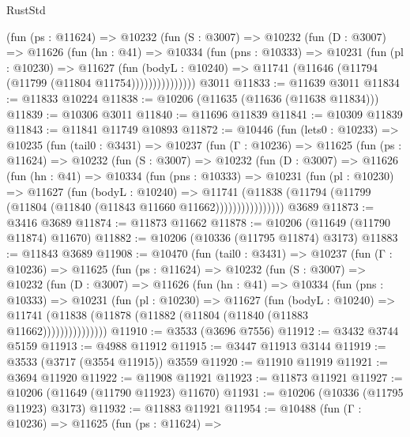 \begin{lexlean}{RustStd}
\begin{coremodule}
            (fun (ps : @11624) =>
            @10232
              (fun (S : @3007) =>
              @10232
                (fun (D : @3007) =>
                @11626
                  (fun (hn : @41) =>
                  @10334
                    (fun (pns : @10333) =>
                    @10231
                      (fun (pl : @10230) =>
                      @11627
                        (fun (bodyL : @10240) =>
                        @11741 (@11646 (@11794 (@11799 (@11804 @11754)))))))))))))))
    @3011
@11833 := @11639 @3011
@11834 := @11833 @10224
@11838 := @10206 (@11635 (@11636 (@11638 @11834)))
@11839 := @10306 @3011
@11840 := @11696 @11839
@11841 := @10309 @11839
@11843 := @11841 @11749 @10893
@11872 := @10446
    (fun (lets0 : @10233) =>
    @10235
      (fun (tail0 : @3431) =>
      @10237
        (fun (Γ : @10236) =>
        @11625
          (fun (ps : @11624) =>
          @10232
            (fun (S : @3007) =>
            @10232
              (fun (D : @3007) =>
              @11626
                (fun (hn : @41) =>
                @10334
                  (fun (pns : @10333) =>
                  @10231
                    (fun (pl : @10230) =>
                    @11627
                      (fun (bodyL : @10240) =>
                      @11741
                        (@11838
                          (@11794 (@11799 (@11804 (@11840 (@11843 @11660 @11662))))))))))))))))
    @3689
@11873 := @3416 @3689
@11874 := @11873 @11662
@11878 := @10206 (@11649 (@11790 @11874) @11670)
@11882 := @10206 (@10336 (@11795 @11874) @3173)
@11883 := @11843 @3689
@11908 := @10470
    (fun (tail0 : @3431) =>
    @10237
      (fun (Γ : @10236) =>
      @11625
        (fun (ps : @11624) =>
        @10232
          (fun (S : @3007) =>
          @10232
            (fun (D : @3007) =>
            @11626
              (fun (hn : @41) =>
              @10334
                (fun (pns : @10333) =>
                @10231
                  (fun (pl : @10230) =>
                  @11627
                    (fun (bodyL : @10240) =>
                    @11741 (@11838 (@11878 (@11882 (@11804 (@11840 (@11883 @11662)))))))))))))))
@11910 := @3533 (@3696 @7556)
@11912 := @3432 @3744 @5159
@11913 := @4988 @11912
@11915 := @3447 @11913 @3144
@11919 := @3533 (@3717 (@3554 @11915)) @3559
@11920 := @11910 @11919
@11921 := @3694 @11920
@11922 := @11908 @11921
@11923 := @11873 @11921
@11927 := @10206 (@11649 (@11790 @11923) @11670)
@11931 := @10206 (@10336 (@11795 @11923) @3173)
@11932 := @11883 @11921
@11954 := @10488
    (fun (Γ : @10236) =>
    @11625
      (fun (ps : @11624) =>

\end{coremodule}
\end{lexlean}
